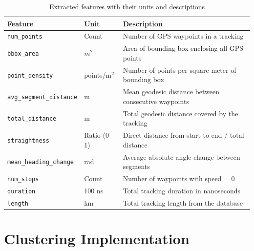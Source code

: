 \documentclass[a4paper,12pt,twoside]{scrreprt}
\begin{document}
\begin{table}[ht]
  \centering
  \begin{tabular}{|l|l|l|}
    \hline
    \textbf{Feature}                & \textbf{Unit} & \textbf{Description}
    \\
    \hline
    \texttt{num\_points}            & Count         & Number of GPS waypoints
    in a tracking
    \\
    \texttt{bbox\_area}             & $m^2$         & Area of bounding box
    enclosing all GPS points
    \\
    \texttt{point\_density}         & points/m$^2$  & Number of points per
    square meter
    of bounding box
    \\
    \texttt{avg\_segment\_distance} & m             & Mean geodesic distance
    between
    consecutive waypoints
    \\
    \texttt{total\_distance}        & m             & Total geodesic distance
    covered by the
    tracking
    \\
    \texttt{straightness}           & Ratio (0–1)   & Direct distance from
    start to end /
    total distance
    \\
    \texttt{mean\_heading\_change}  & rad           & Average absolute angle
    change
    between segments
    \\
    \texttt{num\_stops}             & Count         & Number of waypoints with
    speed = 0
    \\
    \texttt{duration}               & 100 ns        & Total tracking
    duration in nanoseconds
    \\
    \texttt{length}                 & km            & Total tracking length
    from the database
    \\
    \hline
  \end{tabular}
  \caption{Extracted features with their units and descriptions}
  \label{tab:feature_units}
\end{table}

\section{Clustering Implementation}
\end{document}
